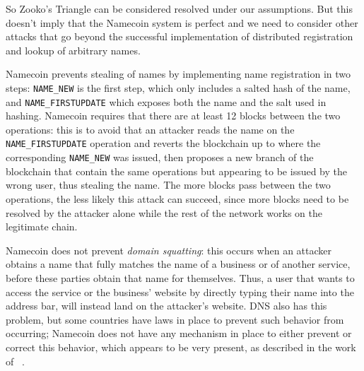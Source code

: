\documentclass[mscthesis]{usiinfthesis}
\begin{document}
So Zooko's Triangle can be considered resolved under our assumptions. But this doesn't imply that the Namecoin system is perfect and we need to consider other attacks that go beyond the successful implementation of distributed registration and lookup of arbitrary names.

Namecoin prevents stealing of names by implementing name registration in two steps: \texttt{NAME\_NEW} is the first step, which only includes a salted hash of the name, and \texttt{NAME\_FIRSTUPDATE} which exposes both the name and the salt used in hashing. Namecoin requires that there are at least 12 blocks between the two operations: this is to avoid that an attacker reads the name on the \texttt{NAME\_FIRSTUPDATE} operation and reverts the blockchain up to where the corresponding \texttt{NAME\_NEW} was issued, then proposes a new branch of the blockchain that contain the same operations but appearing to be issued by the wrong user, thus stealing the name. The more blocks pass between the two operations, the less likely this attack can succeed, since more blocks need to be resolved by the attacker alone while the rest of the network works on the legitimate chain.

Namecoin does not prevent \emph{domain squatting}: this occurs when an attacker obtains a name that fully matches the name of a business or of another service, before these parties obtain that name for themselves. Thus, a user that wants to access the service or the business' website by directly typing their name into the address bar, will instead land on the attacker's website. DNS also has this problem, but some countries have laws in place to prevent such behavior from occurring; Namecoin does not have any mechanism in place to either prevent or correct this behavior, which appears to be very present, as described in the work of ~\cite{kalodner2015empirical}.
\end{document}
